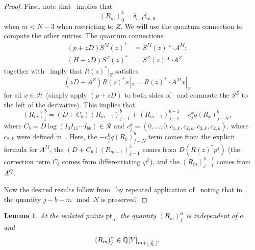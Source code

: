 \documentclass[10pt]{amsart}
\DeclarePairedDelimiter{\floor}{\lfloor}{\rfloor}
\newtheorem{lem}[thm]{Lemma}
\theoremstyle{definition}
\theoremstyle{remark}
\theoremstyle{plain}
\theoremstyle{definition}
\theoremstyle{remark}
\newcommand{\Q}{\mathbb{Q}}
\newcommand{\msc}[1]{\mathscr{#1}}
\newcommand{\mr}[1]{\mathrm{#1}}
\newcommand{\1}{\mathbf{1}}
\newcommand{\2}{\mathbf{2}}
\newcommand{\3}{\mathbf{3}}
\newcommand{\pt}{\mr{pt}}
\numberwithin{equation}{section}
\begin{document}
\begin{proof}
    First, note that~ implies that
    \begin{equation}\label{eqn:rlevel0vanishing}
    (R_m)_0^b = \delta_{b,0} \delta_{m,0} 
    \end{equation}
    when $m < N-3$  when restricting to $Z$. We will use the quantum connection to compute the other entries. The quantum connections
    \begin{align*}
        (p+zD) S^M(z)^* &= S^M(z)* \cdot A^M; \\
        (H+zD) S^Z(z)^* &= S^Z(z)* \cdot A^Z 
    \end{align*}
    together with~ imply that $R(z)^*|_Z$ satisfies
    \begin{equation}\label{eqn:rlevel0recursion}
     (zD+A^Z) R(z)^*x|_Z = R(z)^* \cdot A^M x |_Z 
    \end{equation}
    for all $x \in \msc{H}$ (simply apply $(p+zD)$ to both sides of~ and commute the $S^Z$ to the left of the derivative). This implies that
    \[ (R_m)_j^b = (D+C_b)(R_{m-1})_{j-1}^b + (R_{m-1})_{j-1}^{b-1} - c_j^k q (R_k)_{j-N}^b, \]
    where $C_b = D \log(I_0 I_{11} \cdots I_{bb}) \in \msc{R}$ and $c_j^k = (0, \ldots, 0, c_{1,k}, c_{2,k}, c_{3,k}, c_{2,k})$, where $c_{*,k}$ were defined in~. Here, the $-c_j^kq(R_k)_{j-N}^b$ term comes from the explicit formula for $A^M$, the $(D+C_b)(R_{m-1})_{j-1}^b$ comes from $D (R(z)^*p^j)$ (the correction term $C_b$ comes from differentiating $\varphi^b$), and the $(R_m)_{j-1}^{b-1}$ comes from $A^Q$.

    Now the desired results follow from~ by repeated application of~ noting that in~, the quantity $j-b-m \mod{N}$ is preserved.
\end{proof}

\begin{lem}\label{lem:rlevel1polynomiality}
    At the isolated points $\pt_{\alpha}$, the quantity $(R_m)_j^{\alpha}$ is independent of $\alpha$ and
    \[ (R_m)_j^{\alpha} \in \Q[Y]_{m+\floor{\frac{j}{N}}}. \]
\end{lem}
\end{document}
